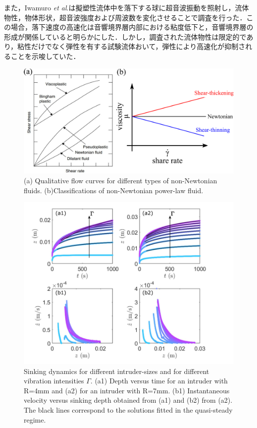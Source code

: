 また，Iwamuro \textit{et al}.\cite{ref:8}は擬塑性流体中を落下する球に超音波振動を照射し，流体物性，物体形状，超音波強度および周波数を変化させることで調査を行った．この場合，落下速度の高速化は音響境界層内部における粘度低下と，音響境界層の形成が関係していると明らかにした．しかし，調査された流体物性は限定的であり，粘性だけでなく弾性を有する試験流体おいて，弾性により高速化が抑制されることを示唆していた．
\begin{figure}[ht]
    \centering
    \includegraphics[width=1\textwidth]{1-Background/shea-thining.eps}
    \caption{(a) Qualitative flow curves for different types of non-Newtonian fluids\cite{ref:1}. (b)Classifications of non-Newtonian power-law fluid.}
    \label{fig:1-fluid-curve}
\end{figure}
\begin{figure}[ht]
    \begin{center}
        \includegraphics[width=12.0cm,clip]{1-Background/4-sinking.png}
        \caption{Sinking dynamics for different intruder-sizes and for different vibration intensities $\Gamma$. (a1) Depth versus time for an intruder with R=4mm and (a2) for an intruder with R=7mm. (b1) Instantaneous velocity versus sinking depth obtained from (a1) and (b2) from (a2). The black lines correspond to the solutions fitted in the quasi-steady regime\cite{ref:6}.}
        \label{fig:4-sinking}
    \end{center}
\end{figure}
\newpage
